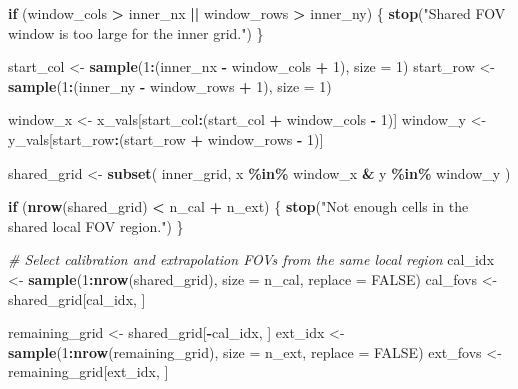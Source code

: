 \documentclass[
  12pt,
]{article}
\newenvironment{Shaded}{\begin{snugshade}}{\end{snugshade}}
\newcommand{\AttributeTok}[1]{\textcolor[rgb]{0.13,0.29,0.53}{#1}}
\newcommand{\CommentTok}[1]{\textcolor[rgb]{0.56,0.35,0.01}{\textit{#1}}}
\newcommand{\ConstantTok}[1]{\textcolor[rgb]{0.56,0.35,0.01}{#1}}
\newcommand{\ControlFlowTok}[1]{\textcolor[rgb]{0.13,0.29,0.53}{\textbf{#1}}}
\newcommand{\DecValTok}[1]{\textcolor[rgb]{0.00,0.00,0.81}{#1}}
\newcommand{\FunctionTok}[1]{\textcolor[rgb]{0.13,0.29,0.53}{\textbf{#1}}}
\newcommand{\NormalTok}[1]{#1}
\newcommand{\OtherTok}[1]{\textcolor[rgb]{0.56,0.35,0.01}{#1}}
\newcommand{\SpecialCharTok}[1]{\textcolor[rgb]{0.81,0.36,0.00}{\textbf{#1}}}
\newcommand{\StringTok}[1]{\textcolor[rgb]{0.31,0.60,0.02}{#1}}
\begin{document}
\begin{Shaded}
\begin{Highlighting}[]
  \ControlFlowTok{if}\NormalTok{ (window\_cols }\SpecialCharTok{\textgreater{}}\NormalTok{ inner\_nx }\SpecialCharTok{||}\NormalTok{ window\_rows }\SpecialCharTok{\textgreater{}}\NormalTok{ inner\_ny) \{}
    \FunctionTok{stop}\NormalTok{(}\StringTok{"Shared FOV window is too large for the inner grid."}\NormalTok{)}
\NormalTok{  \}}

\NormalTok{  start\_col }\OtherTok{\textless{}{-}} \FunctionTok{sample}\NormalTok{(}\DecValTok{1}\SpecialCharTok{:}\NormalTok{(inner\_nx }\SpecialCharTok{{-}}\NormalTok{ window\_cols }\SpecialCharTok{+} \DecValTok{1}\NormalTok{), }\AttributeTok{size =} \DecValTok{1}\NormalTok{)}
\NormalTok{  start\_row }\OtherTok{\textless{}{-}} \FunctionTok{sample}\NormalTok{(}\DecValTok{1}\SpecialCharTok{:}\NormalTok{(inner\_ny }\SpecialCharTok{{-}}\NormalTok{ window\_rows }\SpecialCharTok{+} \DecValTok{1}\NormalTok{), }\AttributeTok{size =} \DecValTok{1}\NormalTok{)}

\NormalTok{  window\_x }\OtherTok{\textless{}{-}}\NormalTok{ x\_vals[start\_col}\SpecialCharTok{:}\NormalTok{(start\_col }\SpecialCharTok{+}\NormalTok{ window\_cols }\SpecialCharTok{{-}} \DecValTok{1}\NormalTok{)]}
\NormalTok{  window\_y }\OtherTok{\textless{}{-}}\NormalTok{ y\_vals[start\_row}\SpecialCharTok{:}\NormalTok{(start\_row }\SpecialCharTok{+}\NormalTok{ window\_rows }\SpecialCharTok{{-}} \DecValTok{1}\NormalTok{)]}

\NormalTok{  shared\_grid }\OtherTok{\textless{}{-}} \FunctionTok{subset}\NormalTok{(}
\NormalTok{    inner\_grid,}
\NormalTok{    x }\SpecialCharTok{\%in\%}\NormalTok{ window\_x }\SpecialCharTok{\&}\NormalTok{ y }\SpecialCharTok{\%in\%}\NormalTok{ window\_y}
\NormalTok{  )}

  \ControlFlowTok{if}\NormalTok{ (}\FunctionTok{nrow}\NormalTok{(shared\_grid) }\SpecialCharTok{\textless{}}\NormalTok{ n\_cal }\SpecialCharTok{+}\NormalTok{ n\_ext) \{}
    \FunctionTok{stop}\NormalTok{(}\StringTok{"Not enough cells in the shared local FOV region."}\NormalTok{)}
\NormalTok{  \}}

  \CommentTok{\# Select calibration and extrapolation FOVs from the same local region}
\NormalTok{  cal\_idx }\OtherTok{\textless{}{-}} \FunctionTok{sample}\NormalTok{(}\DecValTok{1}\SpecialCharTok{:}\FunctionTok{nrow}\NormalTok{(shared\_grid), }\AttributeTok{size =}\NormalTok{ n\_cal, }\AttributeTok{replace =} \ConstantTok{FALSE}\NormalTok{)}
\NormalTok{  cal\_fovs }\OtherTok{\textless{}{-}}\NormalTok{ shared\_grid[cal\_idx, ]}

\NormalTok{  remaining\_grid }\OtherTok{\textless{}{-}}\NormalTok{ shared\_grid[}\SpecialCharTok{{-}}\NormalTok{cal\_idx, ]}
\NormalTok{  ext\_idx }\OtherTok{\textless{}{-}} \FunctionTok{sample}\NormalTok{(}\DecValTok{1}\SpecialCharTok{:}\FunctionTok{nrow}\NormalTok{(remaining\_grid), }\AttributeTok{size =}\NormalTok{ n\_ext, }\AttributeTok{replace =} \ConstantTok{FALSE}\NormalTok{)}
\NormalTok{  ext\_fovs }\OtherTok{\textless{}{-}}\NormalTok{ remaining\_grid[ext\_idx, ]}
\end{Highlighting}
\end{Shaded}
\end{document}
